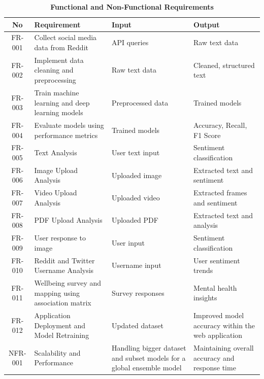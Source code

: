 \begin{table}[h]
    \centering
    \renewcommand{\arraystretch}{1.2}
    \begin{tabularx}{\textwidth}{|c|X|X|X|}
        \hline
        \textbf{No} & \textbf{Requirement} & \textbf{Input} & \textbf{Output} \\
        \hline
        FR-001 & Collect social media data from Reddit & API queries & Raw text data \\
        \hline
        FR-002 & Implement data cleaning and preprocessing & Raw text data & Cleaned, structured text \\
        \hline
        FR-003 & Train machine learning and deep learning models & Preprocessed data & Trained models \\
        \hline
        FR-004 & Evaluate models using performance metrics & Trained models & Accuracy, Recall, F1 Score \\
        \hline
        FR-005 & Text Analysis & User text input & Sentiment classification \\
        \hline
        FR-006 & Image Upload Analysis & Uploaded image & Extracted text and sentiment \\
        \hline
        FR-007 & Video Upload Analysis & Uploaded video & Extracted frames and sentiment \\
        \hline
        FR-008 & PDF Upload Analysis & Uploaded PDF & Extracted text and analysis \\
        \hline
        FR-009 & User response to image & User input & Sentiment classification \\
        \hline
        FR-010 & Reddit and Twitter Username Analysis & Username input & User sentiment trends \\
        \hline
        FR-011 & Wellbeing survey and mapping using association matrix & Survey responses & Mental health insights \\
        \hline
        FR-012 & Application Deployment and Model Retraining & Updated dataset & Improved model accuracy within the web application\\
        \hline
        \hline
        NFR-001 & Scalability and Performance & Handling bigger dataset and subset models for a global ensemble model & Maintaining overall accuracy and response time \\
        \hline
    \end{tabularx}
    \caption*{\textbf{Functional and Non-Functional Requirements}}
\end{table}

\pagebreak
